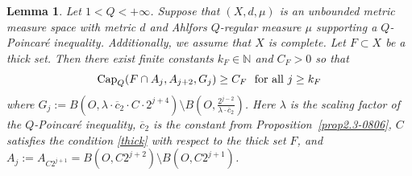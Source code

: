 \documentclass[10pt]{amsart}
\newtheorem{lemma}[theorem]{Lemma}
\numberwithin{equation}{section}
\begin{document}
\begin{lemma}\label{lem5.1-2308}
Let  $1<Q<+\infty$. 
Suppose that $(X,d,\mu)$ is an  unbounded metric measure space with metric $d$ and Ahlfors $Q$-regular measure $\mu$ supporting a $Q$-Poincar\'e inequality. Additionally, we assume that $X$ is complete.
Let $F\subset X$ be a thick set. Then there exist finite constants $k_F\in\mathbb N$ and $C_F>0$ so that  
\begin{equation}\label{eq5.1-2308}
\text{\rm Cap}_Q(F\cap A_{j}, A_{j+2}, G_j)\geq C_F \text{\rm \ \ for all $j\geq k_F$}
\end{equation}
where  $G_j:= B(O,\lambda\cdot \overline c_2 \cdot C\cdot 2^{j+4})\setminus B(O,\frac{2^{j-2}}{\lambda \cdot \overline c_2})$. Here $\lambda$ is the scaling factor of the $Q$-Poincar\'e inequality, $\overline c_2$ is the constant from Proposition~\ref{prop2.3-0806}, $C$ satisfies the condition \eqref{thick} with respect to the thick set $F$, and $A_j:=A_{C2^{j+1}}=B(O,C2^{j+2})\setminus B(O,C2^{j+1})$. 
\end{lemma}
\end{document}
